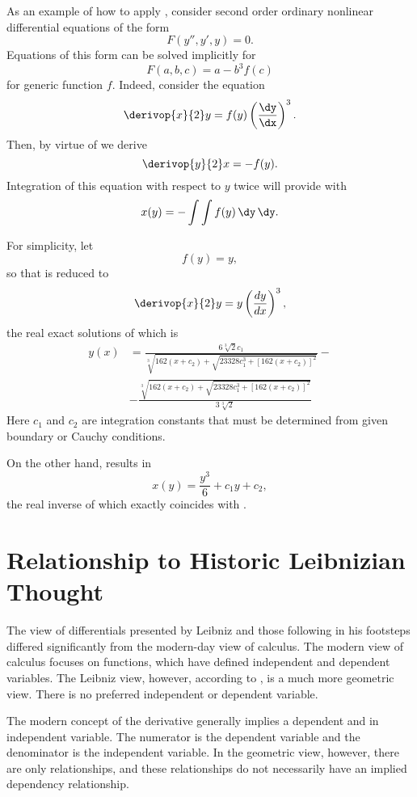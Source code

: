 As an example of how to apply , consider
second order ordinary nonlinear differential equations of the form
\[
F\left(y'', y', y\right) = 0.
\]
Equations of this form can be solved implicitly for
\[
F\left(a, b, c\right) = a - b^3 f(c)
\]
for generic function $f$. 
Indeed, consider the equation
\begin{equation}\label{ODE}
\derivop{x}{2} y = f(y) \left(\frac{\dy}{\dx}\right)^3.
\end{equation}
Then, by virtue of  we derive
\[
\derivop{y}{2} x = - f(y).
\]
Integration of this equation with respect to $y$ twice will provide with
\begin{equation}\label{implicitsol}
x(y) = - \int \int f(y) \, \dy\, \dy.
\end{equation}

For simplicity, let
\[
f(y) = y,
\]
so that  is reduced to
\[
\derivop{x}{2} y = y \left(\frac{d y}{dx}\right)^3,
\]
the real exact solutions of which is
\begin{equation}\label{sol}\begin{split}
y(x) &= \frac{6 \sqrt[3]{2} c_1}{\sqrt[3]{162(x + c_2) + \sqrt{23328 c_1^3 + \left[162 (x + c_2) \right]^2}}} - \\
&- \frac{\sqrt[3]{162(x + c_2) + \sqrt{23328 c_1^3 + \left[162 (x + c_2) \right]^2}}}{3 \sqrt[3]{2}}
\end{split}\end{equation}
Here $c_1$ and $c_2$ are integration constants that must be determined from given boundary or Cauchy conditions.


On the other hand,  results in
\[
x(y) = \frac{y^3}{6} + c_1 y + c_2,
\]
the real inverse of which exactly coincides with .

\section{Relationship to Historic Leibnizian Thought}
\label{secliebnizhist}

The view of differentials presented by Leibniz and those following in his footsteps differed significantly from the modern-day view of calculus.
The modern view of calculus focuses on functions, which have defined independent and dependent variables.
The Leibniz view, however, according to \citep{bos1974}, is a much more geometric view.
There is no preferred independent or dependent variable.

The modern concept of the derivative generally implies a dependent and in independent variable.
The numerator is the dependent variable and the denominator is the independent variable.
In the geometric view, however, there are only relationships, and these relationships do not necessarily have an implied dependency relationship.

